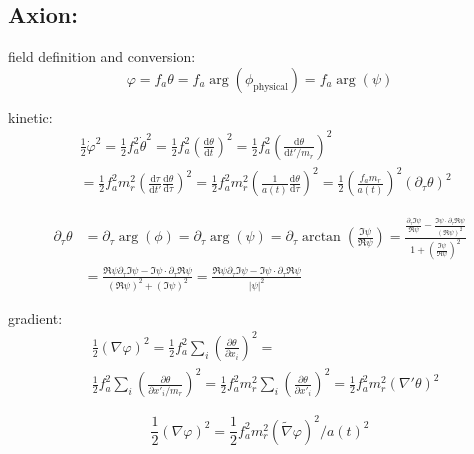 \documentclass[a4paper]{article}
\begin{document}
\subsection{Axion:}

field definition and conversion:
\begin{equation}
    \varphi = f_a \theta = f_a \arg(\phi_\mathrm{physical}) = f_a \arg(\psi)
\end{equation}

kinetic:
\begin{align}
    &\frac{1}{2} \dot{\varphi}^2 = \frac{1}{2} f_a^2 \dot{\theta}^2
    = \frac{1}{2} f_a^2 \left( \frac{\mathrm{d} \theta}{\mathrm{d} t} \right)^2
    = \frac{1}{2} f_a^2 \left( \frac{\mathrm{d} \theta}{\mathrm{d} t' / m_r} \right)^2 \\
    &= \frac{1}{2} f_a^2 m_r^2 \left( \frac{\mathrm{d} \tau}{\mathrm{d} t'} \frac{\mathrm{d} \theta}{\mathrm{d} \tau} \right)^2
    = \frac{1}{2} f_a^2 m_r^2 \left( \frac{1}{a(t)} \frac{\mathrm{d} \theta}{\mathrm{d} \tau} \right)^2
    = \frac{1}{2} \left( \frac{f_a m_r}{a(t)} \right)^2 \left( \partial_\tau \theta \right)^2
\end{align}

\begin{align}
    \partial_\tau \theta &= \partial_\tau \arg(\phi) = \partial_\tau \arg(\psi) = \partial_\tau \arctan \left( \frac{ \Im \psi }{ \Re \psi } \right)
    = \frac{ \frac{ \partial_\tau \Im \psi }{ \Re \psi } - \frac{ \Im \psi \cdot \partial_\tau \Re \psi}{(\Re \psi)^2}}{ 1 + \left( \frac{\Im \psi}{\Re \psi} \right)^2} \\
                         &= \frac{ \Re \psi \partial_\tau \Im \psi - \Im \psi \cdot \partial_\tau \Re \psi}{ (\Re \psi)^2 + (\Im \psi)^2} =  \frac{ \Re \psi \partial_\tau \Im \psi - \Im \psi \cdot \partial_\tau \Re \psi}{|\psi|^2}
\end{align}

gradient:
\begin{align}
 &\frac{1}{2} (\nabla \varphi)^2 =
 \frac{1}{2} f_a^2 \sum_i \left(\frac{\partial \theta}{\partial x_i}\right)^2 = \\
 &\frac{1}{2} f_a^2 \sum_i \left(\frac{\partial \theta}{\partial x'_i / m_r}\right)^2 =
 \frac{1}{2} f_a^2 m_r^2 \sum_i \left(\frac{\partial \theta}{\partial x'_i}\right)^2 =
 \frac{1}{2} f_a^2 m_r^2 (\nabla' \theta)^2
\end{align}

\begin{equation}
    \frac{1}{2} (\nabla \varphi)^2 = \frac{1}{2} f_a^2 m_r^2 (\tilde{\nabla} \varphi)^2 / a(t)^2
\end{equation}
\end{document}
